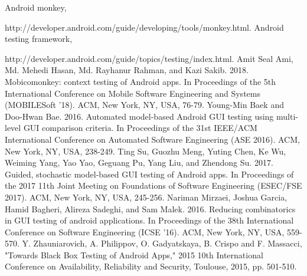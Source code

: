 \documentclass[conference]{IEEEtran}
\begin{document}
\begin{thebibliography}{00}
 Android monkey,



http://developer.android.com/guide/developing/tools/monkey.html.
Android testing framework,

http://developer.android.com/guide/topics/testing/index.html.
 Amit Seal Ami, Md. Mehedi Hasan, Md. Rayhanur Rahman, and Kazi Sakib. 2018. Mobicomonkey: context testing of Android apps. In Proceedings of the 5th International Conference on Mobile Software Engineering and Systems (MOBILESoft '18). ACM, New York, NY, USA, 76-79.
 Young-Min Baek and Doo-Hwan Bae. 2016. Automated model-based Android GUI testing using multi-level GUI comparison criteria. In Proceedings of the 31st IEEE/ACM International Conference on Automated Software Engineering (ASE 2016). ACM, New York, NY, USA, 238-249.
 Ting Su, Guozhu Meng, Yuting Chen, Ke Wu, Weiming Yang, Yao Yao, Geguang Pu, Yang Liu, and Zhendong Su. 2017. Guided, stochastic model-based GUI testing of Android apps. In Proceedings of the 2017 11th Joint Meeting on Foundations of Software Engineering (ESEC/FSE 2017). ACM, New York, NY, USA, 245-256.
 Nariman Mirzaei, Joshua Garcia, Hamid Bagheri, Alireza Sadeghi, and Sam Malek. 2016. Reducing combinatorics in GUI testing of android applications. In Proceedings of the 38th International Conference on Software Engineering (ICSE '16). ACM, New York, NY, USA, 559-570.
 Y. Zhauniarovich, A. Philippov, O. Gadyatskaya, B. Crispo and F. Massacci, "Towards Black Box Testing of Android Apps," 2015 10th International Conference on Availability, Reliability and Security, Toulouse, 2015, pp. 501-510.
\end{thebibliography}
\end{document}

